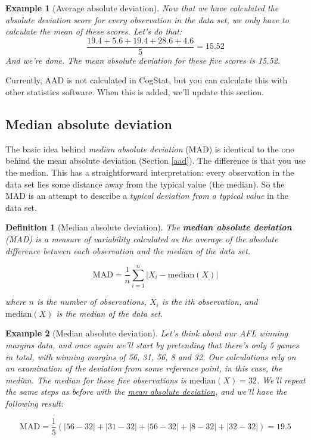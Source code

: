 \documentclass[
  11pt,
]{book}
\theoremstyle{indenteddefinition}
\newtheorem{definition}{Definition}[chapter]
\theoremstyle{indenteddefinition}
\newtheorem{example}{Example}[chapter]
\theoremstyle{definition}
\theoremstyle{definition}
\theoremstyle{remark}
\begin{document}
\begin{example}[Average absolute deviation]
Now that we have calculated the absolute deviation score for every observation in the data set, we only have to calculate the mean of these scores. Let's do that:
\[
\frac{19.4 + 5.6 + 19.4 + 28.6 + 4.6}{5} = 15.52
\]
And we're done. The mean absolute deviation for these five scores is 15.52.
\end{example}

Currently, AAD is not calculated in CogStat, but you can calculate this with other statistics software. When this is added, we'll update this section.

\hypertarget{mad}{%
\subsection{Median absolute deviation}\label{mad}}

The basic idea behind \emph{median absolute deviation} (MAD) is identical to the one behind the mean absolute deviation (Section \ref{aad}). The difference is that you use the median. This has a straightforward interpretation: every observation in the data set lies some distance away from the typical value (the median). So the MAD is an attempt to describe a \emph{typical deviation from a typical value} in the data set.

\begin{definition}[Median absolute deviation]
\protect\hypertarget{def:defMAD}{}\label{def:defMAD}The \textbf{median absolute deviation} (MAD) is a measure of variability calculated as the average of the absolute difference between each observation and the \emph{median} of the data set.

\[
\text{MAD} = \frac{1}{n} \sum_{i=1}^n |X_i - \text{median}(X)|
\]

where \(n\) is the number of observations, \(X_i\) is the \(i\)th observation, and \(\text{median}(X)\) is the median of the data set.
\end{definition}

\begin{example}[Median absolute deviation]
\protect\hypertarget{exm:exMAD}{}\label{exm:exMAD}Let's think about our AFL winning margins data, and once again we'll start by pretending that there's only 5 games in total, with winning margins of 56, 31, 56, 8 and 32. Our calculations rely on an examination of the deviation from some reference point, in this case, the median. The median for these five observations is \(\text{median}(X) = 32\). We'll repeat the same steps as before with the \protect\hyperlink{exAAD}{mean absolute deviation}, and we'll have the following result:

\[
\text{MAD} = \frac{1}{5} \left( |56 - 32| + |31 - 32| + |56 - 32| + |8 - 32| + |32 - 32| \right) = 19.5
\]
\end{example}
\end{document}
